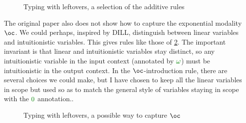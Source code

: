 \begin{figure}
  \caption{Typing with leftovers, a selection of the additive rules}
  \label{fig:twl-add}
\end{figure}

The original paper also does not show how to capture the exponential modality
$\oc$.
We could perhaps, inspired by DILL, distinguish between linear variables and
intuitionistic variables.
This gives rules like those of \cref{fig:twl-exp}.
The important invariant is that linear and intuitionistic variables stay
distinct, so any intuitionistic variable in the input context (annotated by
$\gr\omega$) must be intuitionistic in the output context.
In the $\oc$-introduction rule, there are several choices we could make, but I
have chosen to keep all the linear variables in scope but used so as to match
the general style of variables staying in scope with the $\gr0$ annotation..

\begin{figure}
  \caption{Typing with leftovers, a possible way to capture $\oc$}
  \label{fig:twl-exp}
\end{figure}

